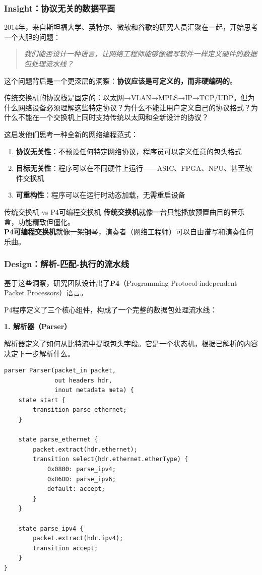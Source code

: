 \subsubsection{Insight：协议无关的数据平面}

2014年，来自斯坦福大学、英特尔、微软和谷歌的研究人员汇聚在一起，开始思考一个大胆的问题：

\begin{quote}
\textit{我们能否设计一种语言，让网络工程师能够像编写软件一样定义硬件的数据包处理流水线？}
\end{quote}

这个问题背后是一个更深层的洞察：\textbf{协议应该是可定义的，而非硬编码的}。

传统交换机的协议栈是固定的：以太网→VLAN→MPLS→IP→TCP/UDP。但为什么网络设备必须理解这些特定协议？为什么不能让用户定义自己的协议格式？为什么不能在一个交换机上同时支持传统以太网和全新设计的协议？

这启发他们思考一种全新的网络编程范式：
\begin{enumerate}
    \item \textbf{协议无关性}：不预设任何特定网络协议，程序员可以定义任意的包头格式
    \item \textbf{目标无关性}：程序可以在不同硬件上运行——ASIC、FPGA、NPU、甚至软件交换机
    \item \textbf{可重构性}：程序可以在运行时动态加载，无需重启设备
\end{enumerate}

\begin{analogy}{传统交换机 vs P4可编程交换机}
\textbf{传统交换机}就像一台只能播放预置曲目的音乐盒，功能精致但僵化。\\
\textbf{P4可编程交换机}就像一架钢琴，演奏者（网络工程师）可以自由谱写和演奏任何乐曲。
\end{analogy}

\subsubsection{Design：解析-匹配-执行的流水线}

基于这些洞察，研究团队设计出了\textbf{P4}（Programming Protocol-independent Packet Processors）语言。

P4程序定义了三个核心组件，构成了一个完整的数据包处理流水线：

\textbf{1. 解析器（Parser）}

解析器定义了如何从比特流中提取包头字段。它是一个状态机，根据已解析的内容决定下一步解析什么。

\begin{lstlisting}[language=P4, caption=简单的P4解析器示例]
parser Parser(packet_in packet,
              out headers hdr,
              inout metadata meta) {
    state start {
        transition parse_ethernet;
    }
    
    state parse_ethernet {
        packet.extract(hdr.ethernet);
        transition select(hdr.ethernet.etherType) {
            0x0800: parse_ipv4;
            0x86DD: parse_ipv6;
            default: accept;
        }
    }
    
    state parse_ipv4 {
        packet.extract(hdr.ipv4);
        transition accept;
    }
}
\end{lstlisting}


